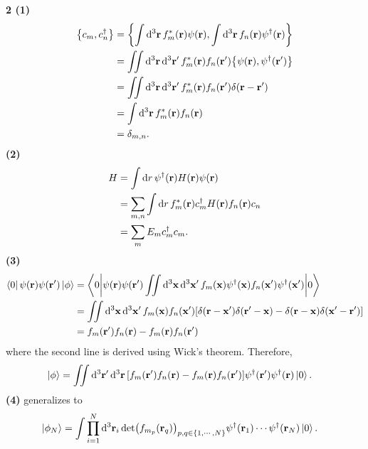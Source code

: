 \documentclass{article}
\makeatletter
\newcommand*{\shifttext}[1]{%
  \settowidth{\@tempdima}{#1}%
  \hspace{-\@tempdima}#1%
}
\newcommand{\plabel}[1]{%
\shifttext{\textbf{#1}\quad}%
}
\newcommand{\prule}{%
\begin{center}%
\hdashrule[0.5ex]{.99\linewidth}{1pt}{1pt 2.5pt}%
\end{center}%
}
\newcommand{\minusbaseline}{\abovedisplayskip=0pt\abovedisplayshortskip=0pt~\vspace*{-\baselineskip}}%
\makeatother
\begin{document}
\prule

\plabel{2 (1)}%
\begingroup\minusbaseline
\begin{align*}
    \qty{c_m, c^\dagger_n} &= \qty{\int \dd[3]{\vb{r}} f^*_m(\vb{r}) \psi(\vb{r}), \int \dd[3]{\vb{r}} f_n(\vb{r}) \psi^\dagger(\vb{r})} \\
    &= \iint \dd[3]{\vb{r}}\dd[3]{\vb{r}'} f^*_m(\vb{r}) f_n(\vb{r}') \qty{\psi(\vb{r}),\psi^\dagger(\vb{r}')} \\
    &= \iint \dd[3]{\vb{r}}\dd[3]{\vb{r}'} f^*_m(\vb{r}) f_n(\vb{r}') \delta(\vb{r} - \vb{r}') \\
    &= \int \dd[3]{\vb{r}} f^*_m(\vb{r}) f_n(\vb{r}) \\
    &= \delta_{m,n}.
\end{align*}
\endgroup
\plabel{(2)}%
\begingroup\minusbaseline
\begin{align*}
    H &= \int \dd{r} \psi^\dagger(\vb{r}) H(\vb{r}) \psi(\vb{r}) \\
    &= \sum_{m,n} \int \dd{r} f^*_m(\vb{r}) c^\dagger_m H(\vb{r}) f_n(\vb{r}) c_n \\
    &= \sum_m E_m c^\dagger_m c_m.
\end{align*}
\endgroup
\plabel{(3)}%
\begingroup\minusbaseline
\begin{align*}
    \bra{0} \psi(\vb{r})\psi(\vb{r}') \ket{\phi} &= \ev**{\psi(\vb{r})\psi(\vb{r}')  \iint \dd[3]{\vb{x}}\dd[3]{\vb{x}'} f_m(\vb{x}) \psi^\dagger(\vb{x}) f_n(\vb{x}') \psi^\dagger(\vb{x}')}{0} \\
    &= \iint \dd[3]{\vb{x}} \dd[3]{\vb{x}'} f_m(\vb{x})f_n(\vb{x}') \qty[\delta(\vb{r} - \vb{x}') \delta(\vb{r}' - \vb{x}) - \delta(\vb{r} - \vb{x})\delta(\vb{x}' - \vb{r}')] \\
    &= f_m(\vb{r}')f_n(\vb{r}) - f_m(\vb{r}) f_n(\vb{r}')
\end{align*}
\endgroup
where the second line is derived using Wick's theorem.
Therefore,
\begin{align}
    \label{eq:phi_2p}\ket{\phi} &= \iint \dd[3]{\vb{r}'} \dd[3]{\vb{r}} \qty[f_m(\vb{r}')f_n(\vb{r}) - f_m(\vb{r}) f_n(\vb{r}')] \psi^\dagger(\vb{r}')\psi^\dagger(\vb{r})\ket{0}.
\end{align}
\plabel{(4)}%
 generalizes to
\begin{align*}
    \ket{\phi_N} &= \int \prod_{i=1}^N \dd[3]{\vb{r}_i} \det(f_{m_p}(\vb{r}_q))_{p,q\in\qty{1,\cdots,N}} \psi^\dagger(\vb{r}_1) \cdots \psi^\dagger(\vb{r}_N)\ket{0}.
\end{align*}
\end{document}
